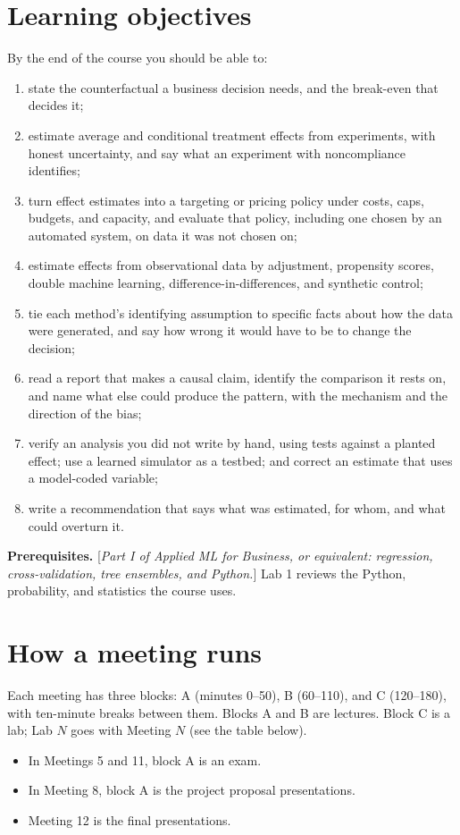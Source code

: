 \documentclass[11pt]{article}
\newcommand{\tbd}[1]{\textcolor{warnred}{[\emph{#1}]}}
\begin{document}
\section*{Learning objectives}

By the end of the course you should be able to:
\begin{enumerate}
    \item state the counterfactual a business decision needs, and the break-even that decides it;
    \item estimate average and conditional treatment effects from experiments, with honest uncertainty, and
    say what an experiment with noncompliance identifies;
    \item turn effect estimates into a targeting or pricing policy under costs, caps, budgets, and capacity, and
    evaluate that policy, including one chosen by an automated system, on data it was not chosen on;
    \item estimate effects from observational data by adjustment, propensity scores, double machine
    learning, difference-in-differences, and synthetic control;
    \item tie each method's identifying assumption to specific facts about how the data were
    generated, and say how wrong it would have to be to change the decision;
    \item read a report that makes a causal claim, identify the comparison it rests on, and name
    what else could produce the pattern, with the mechanism and the direction of the bias;
    \item verify an analysis you did not write by hand, using tests against a planted effect; use a
    learned simulator as a testbed; and correct an estimate that uses a model-coded variable;
    \item write a recommendation that says what was estimated, for whom, and what could overturn it.
\end{enumerate}

\textbf{Prerequisites.} \tbd{Part I of Applied ML for Business, or equivalent: regression,
cross-validation, tree ensembles, and Python.} Lab 1 reviews the Python, probability, and
statistics the course uses.

\section*{How a meeting runs}

Each meeting has three blocks: A (minutes 0--50), B (60--110), and C (120--180), with ten-minute
breaks between them. Blocks A and B are lectures. Block C is a lab; Lab $N$ goes with Meeting $N$ (see the table below).
\begin{itemize}
    \item In Meetings 5 and 11, block A is an exam.
    \item In Meeting 8, block A is the project proposal presentations.
    \item Meeting 12 is the final presentations.
\end{itemize}
\end{document}
